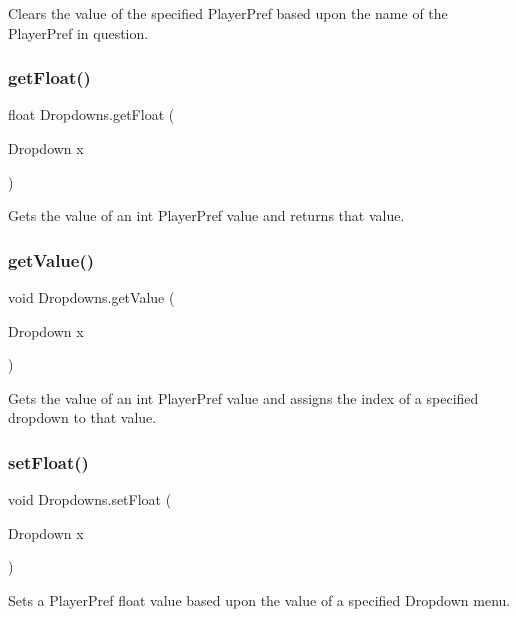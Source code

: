 Clears the value of the specified Player\+Pref based upon the name of the Player\+Pref in question. \mbox{\label{class_dropdowns_abf1eed7ac478b707ce258d5a89160520}} 
\subsubsection{\texorpdfstring{get\+Float()}{getFloat()}}
{\footnotesize\ttfamily float Dropdowns.\+get\+Float (\begin{DoxyParamCaption}\item[{Dropdown}]{x }\end{DoxyParamCaption})}

Gets the value of an int Player\+Pref value and returns that value. \mbox{\label{class_dropdowns_a670e65ca917ea1ed349524022d50e02a}} 
\subsubsection{\texorpdfstring{get\+Value()}{getValue()}}
{\footnotesize\ttfamily void Dropdowns.\+get\+Value (\begin{DoxyParamCaption}\item[{Dropdown}]{x }\end{DoxyParamCaption})}

Gets the value of an int Player\+Pref value and assigns the index of a specified dropdown to that value. \mbox{\label{class_dropdowns_a41cceb5188d9f7e1b311c23b3a625c65}} 
\subsubsection{\texorpdfstring{set\+Float()}{setFloat()}}
{\footnotesize\ttfamily void Dropdowns.\+set\+Float (\begin{DoxyParamCaption}\item[{Dropdown}]{x }\end{DoxyParamCaption})}

Sets a Player\+Pref float value based upon the value of a specified Dropdown menu. \mbox{\label{class_dropdowns_a37bc66166091cc37bb3ff8aa1e6fb0d4}} 
